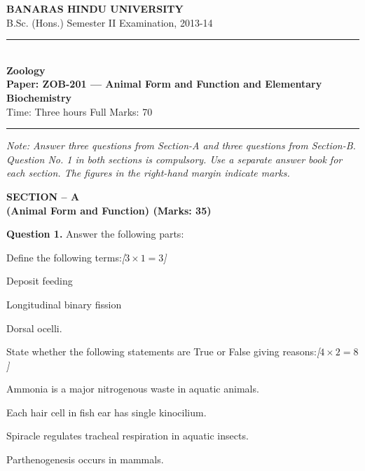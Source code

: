 \documentclass[11pt,a4paper]{article}
\newcommand{\pts}[1]{\hfill   \textit{[#1]}}
\begin{document}
\begin{center}
  {\large\bfseries BANARAS HINDU UNIVERSITY}\\[2pt]
  {\normalsize B.Sc. (Hons.) Semester II Examination, 2013-14}\\[6pt]
  \rule{0.8\linewidth}{0.5pt}\\[6pt]
  {\large\bfseries Zoology}\\[4pt]
  {\large\bfseries Paper: ZOB-201 --- Animal Form and Function and Elementary Biochemistry}\\[4pt]
  {\normalsize Time: Three hours \hfill Full Marks: 70}
\end{center}

\rule{\linewidth}{0.4pt}

\smallskip



\noindent   \textit{Note: Answer three questions from Section-A and three questions from Section-B. Question No. 1 in both sections is compulsory. Use a separate answer book for each section. The figures in the right-hand margin indicate marks.}

\bigskip

\begin{center}
   \textbf{SECTION -- A} \\
   \textbf{(Animal Form and Function) (Marks: 35)}
\end{center}

\medskip


\noindent   \textbf{Question 1.} Answer the following parts:

\begin{parts}
  \item Define the following terms:\pts{$3  \times 1 = 3$}
  
\begin{parts}
    \item Deposit feeding
    \item Longitudinal binary fission
    \item Dorsal ocelli.
  \end{parts}
  
  \item State whether the following statements are True or False giving reasons:\pts{$4  \times 2 = 8$}
  
\begin{parts}
    \item Ammonia is a major nitrogenous waste in aquatic animals.
    \item Each hair cell in fish ear has single kinocilium.
    \item Spiracle regulates tracheal respiration in aquatic insects.
    \item Parthenogenesis occurs in mammals.
  \end{parts}
\end{parts}
\end{document}
